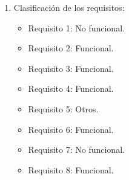 \begin{solucion}
    \begin{enumerate}
        \item Clasificación de los requisitos:
        \begin{itemize}
            \item Requisito 1: No funcional.
            \item Requisito 2: Funcional.
            \item Requisito 3: Funcional.
            \item Requisito 4: Funcional.
            \item Requisito 5: Otros.
            \item Requisito 6: Funcional.
            \item Requisito 7: No funcional.
            \item Requisito 8: Funcional.
        \end{itemize}


\end{enumerate}
\end{solucion}
